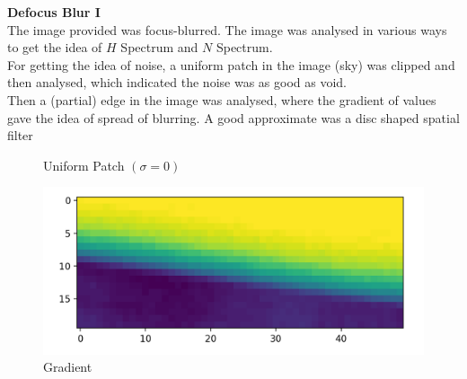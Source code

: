 \documentclass{article}
\begin{document}
    \textbf{Defocus Blur I}\\
    The image provided was focus-blurred. The image was analysed in various ways to get the idea of \(H\) Spectrum and \(N\) Spectrum.\\[1pt]
    For getting the idea of noise, a uniform patch in the image (sky) was clipped and then analysed, which indicated the noise was as good as void.\\
    Then a (partial) edge in the image was analysed, where the gradient of values gave the idea of spread of blurring. A good approximate was a disc shaped spatial filter\\
    \begin{figure}[!htb]
     \centering
      \caption{Uniform Patch \((\sigma = 0)\)}
    \endminipage\hfill
    \centering
      \includegraphics[scale=0.45]{./real_world/bharti/gradient.png}
      \caption{Gradient}
    \endminipage\hfill
    \end{figure}
    \bigbreak
\end{document}
